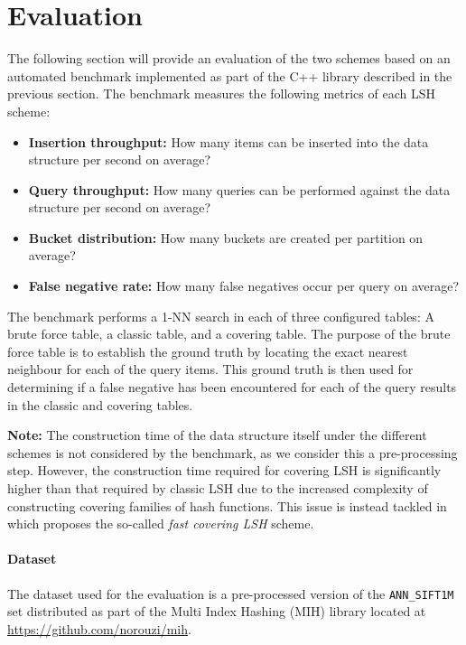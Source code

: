 \section{Evaluation}
\label{evaluation}

The following section will provide an evaluation of the two schemes based on an automated benchmark implemented as part of the C++ library described in the previous section. The benchmark measures the following metrics of each LSH scheme:

\begin{itemize}
  \item \textbf{Insertion throughput:} How many items can be inserted into the data structure per second on average?
  \item \textbf{Query throughput:} How many queries can be performed against the data structure per second on average?
  \item \textbf{Bucket distribution:} How many buckets are created per partition on average?
  \item \textbf{False negative rate:} How many false negatives occur per query on average?
\end{itemize}

The benchmark performs a 1-NN search in each of three configured tables: A brute force table, a classic table, and a covering table. The purpose of the brute force table is to establish the ground truth by locating the exact nearest neighbour for each of the query items. This ground truth is then used for determining if a false negative has been encountered for each of the query results in the classic and covering tables.

\textbf{Note:} The construction time of the data structure itself under the different schemes is not considered by the benchmark, as we consider this a pre-processing step. However, the construction time required for covering LSH is significantly higher than that required by classic LSH due to the increased complexity of constructing covering families of hash functions. This issue is instead tackled in \cite{DBLP:journals/corr/PhamP16} which proposes the so-called \textit{fast covering LSH} scheme.

\paragraph{Dataset} The dataset used for the evaluation is a pre-processed version of the \texttt{ANN\_SIFT1M} set distributed as part of the Multi Index Hashing (MIH) library located at \url{https://github.com/norouzi/mih}.

